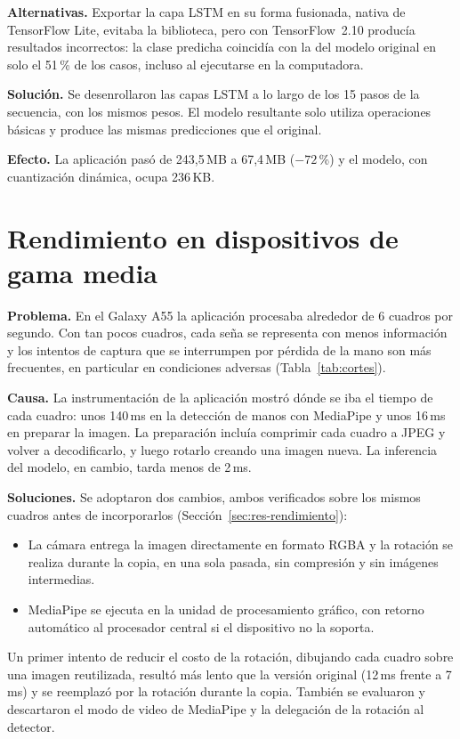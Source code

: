 \textbf{Alternativas.} Exportar la capa LSTM en su forma fusionada, nativa de TensorFlow Lite, evitaba la biblioteca, pero con TensorFlow~2.10 producía resultados incorrectos: la clase predicha coincidía con la del modelo original en solo el 51\,\% de los casos, incluso al ejecutarse en la computadora.

\textbf{Solución.} Se desenrollaron las capas LSTM a lo largo de los 15 pasos de la secuencia, con los mismos pesos. El modelo resultante solo utiliza operaciones básicas y produce las mismas predicciones que el original.

\textbf{Efecto.} La aplicación pasó de 243,5\,MB a 67,4\,MB ($-72$\,\%) y el modelo, con cuantización dinámica, ocupa 236\,KB.

\section{Rendimiento en dispositivos de gama media}

\textbf{Problema.} En el Galaxy A55 la aplicación procesaba alrededor de 6 cuadros por segundo. Con tan pocos cuadros, cada seña se representa con menos información y los intentos de captura que se interrumpen por pérdida de la mano son más frecuentes, en particular en condiciones adversas (Tabla~\ref{tab:cortes}).

\textbf{Causa.} La instrumentación de la aplicación mostró dónde se iba el tiempo de cada cuadro: unos 140\,ms en la detección de manos con MediaPipe y unos 16\,ms en preparar la imagen. La preparación incluía comprimir cada cuadro a JPEG y volver a decodificarlo, y luego rotarlo creando una imagen nueva. La inferencia del modelo, en cambio, tarda menos de 2\,ms.

\textbf{Soluciones.} Se adoptaron dos cambios, ambos verificados sobre los mismos cuadros antes de incorporarlos (Sección~\ref{sec:res-rendimiento}):

\begin{itemize}
    \item La cámara entrega la imagen directamente en formato RGBA y la rotación se realiza durante la copia, en una sola pasada, sin compresión y sin imágenes intermedias.
    \item MediaPipe se ejecuta en la unidad de procesamiento gráfico, con retorno automático al procesador central si el dispositivo no la soporta.
\end{itemize}

Un primer intento de reducir el costo de la rotación, dibujando cada cuadro sobre una imagen reutilizada, resultó más lento que la versión original (12\,ms frente a 7\,ms) y se reemplazó por la rotación durante la copia. También se evaluaron y descartaron el modo de video de MediaPipe y la delegación de la rotación al detector.

